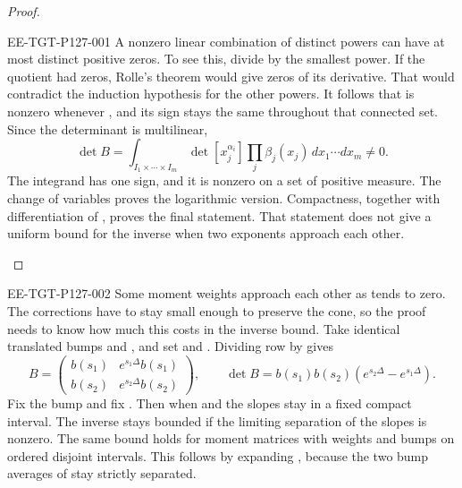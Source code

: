 %
\begin{proof}
\begin{EESegment}{EE-TGT-P127-001}
A nonzero linear combination of  distinct powers can have at
most  distinct positive zeros. To see this, divide by the
smallest power. If the quotient had  zeros, Rolle's theorem
would give  zeros of its derivative. That would contradict the
induction hypothesis for the other  powers. It follows that
 is nonzero whenever
, and its sign stays the same throughout that
connected set. Since the determinant is multilinear,
\[
\det B
=\int_{I_1\times\cdots\times I_m}\det[x_j^{\alpha_i}]
  \prod_j\beta_j(x_j)\,dx_1\cdots dx_m\ne0.
\]
The integrand has one sign, and it is nonzero on a set of positive measure. The change of
variables  proves the logarithmic version. Compactness,
together with differentiation of , proves the final
statement. That statement does not give a uniform bound for the inverse when two exponents
approach each other.
\end{EESegment}
\end{proof}

\begin{EESegment}{EE-TGT-P127-002}
Some moment weights approach each other as  tends to
zero. The corrections have to stay small enough to preserve the cone, so the proof needs to
know how much this costs in the inverse bound. Take identical translated bumps
 and
, and set
 and
. Dividing row
 by  gives
\begin{equation}
B=
\begin{pmatrix}
b(s_1)&e^{s_1\Delta}b(s_1)\\
b(s_2)&e^{s_2\Delta}b(s_2)
\end{pmatrix},
\qquad
\det B=b(s_1)b(s_2)(e^{s_2\Delta}-e^{s_1\Delta}).
\tag{A.1}\label{eq:A.1}
\end{equation}
Fix the bump and fix . Then
 when
 and the slopes stay in a fixed compact interval.
The inverse stays
bounded if the limiting separation of the slopes is nonzero. The same
 bound holds for moment matrices with weights
 and bumps on ordered disjoint intervals. This
follows by expanding
, because the two
bump averages of  stay strictly separated.
\end{EESegment}

